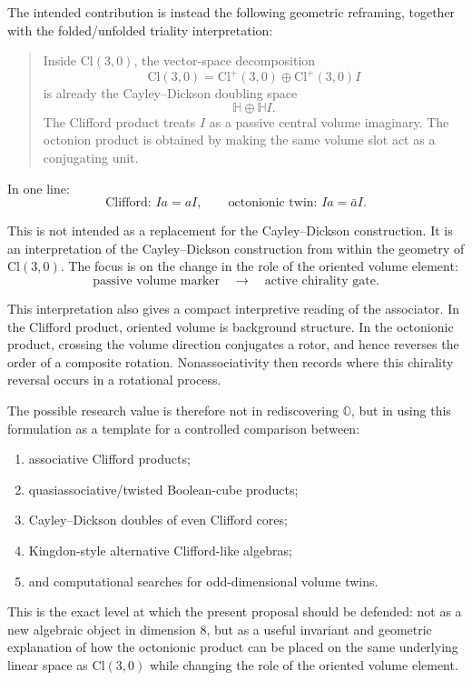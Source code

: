 \documentclass[11pt]{article}
\newcommand{\Cl}{\mathrm{Cl}}
\begin{document}
The intended contribution is instead the following geometric reframing, together with the folded/unfolded triality interpretation:
\begin{quote}
Inside $\Cl(3,0)$, the vector-space decomposition
\[
\Cl(3,0)=\Cl^+(3,0)\oplus \Cl^+(3,0)I
\]
is already the Cayley--Dickson doubling space
\[
\mathbb H\oplus \mathbb H I.
\]
The Clifford product treats $I$ as a passive central volume imaginary. The
octonion product is obtained by making the same volume slot act as a
conjugating unit.
\end{quote}

In one line:
\[
\text{Clifford: } Ia=aI,
\qquad
\text{octonionic twin: } Ia=\bar a I.
\]

This is not intended as a replacement for the Cayley--Dickson construction. It
is an interpretation of the Cayley--Dickson construction from within the
geometry of $\Cl(3,0)$. The focus is on the change in the role of the oriented
volume element:
\[
\text{passive volume marker}
\quad\longrightarrow\quad
\text{active chirality gate}.
\]

This interpretation also gives a compact interpretive reading of the associator.
In the Clifford product, oriented volume is background structure. In the
octonionic product, crossing the volume direction conjugates a rotor, and hence
reverses the order of a composite rotation. Nonassociativity then records where
this chirality reversal occurs in a rotational process.

The possible research value is therefore not in rediscovering $\mathbb O$, but
in using this formulation as a template for a controlled comparison between:
\begin{enumerate}
    \item associative Clifford products;
    \item quasiassociative/twisted Boolean-cube products;
    \item Cayley--Dickson doubles of even Clifford cores;
    \item Kingdon-style alternative Clifford-like algebras;
    \item and computational searches for odd-dimensional volume twins.
\end{enumerate}

This is the exact level at which the present proposal should be defended: not
as a new algebraic object in dimension $8$, but as a useful invariant and
geometric explanation of how the octonionic product can be placed on the same
underlying linear space as $\Cl(3,0)$ while changing the role of the oriented
volume element.
\end{document}
